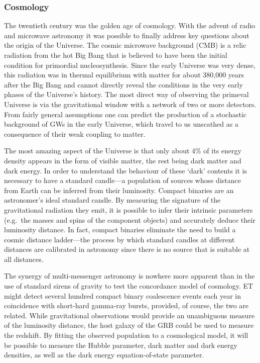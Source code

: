 \FloatBarrier
\subsubsection{Cosmology}
The twentieth century was the golden age of cosmology. With
the advent of radio and microwave astronomy it was possible to
finally address key questions about the origin of the
Universe.  The cosmic microwave background (CMB) is a relic radiation
from the hot Big Bang that is believed to have been the
initial condition for primordial nucleosynthesis. Since the early
Universe was very dense, this radiation was in thermal
equilibrium with matter for about 380,000 years after the Big
Bang and cannot directly reveal the conditions in the very
early phases of the Universe's history. The most direct way of
observing the primeval Universe is via the gravitational
window with a network of two or more detectors. From fairly
general assumptions one can predict the production of
a stochastic background of GWs in the early Universe, which travel
to us unscathed as a consequence of their weak coupling to matter.

The most amazing aspect of the Universe is that only about
4\% of its energy density appears in the form of visible matter,
the rest being dark matter and dark energy.
In order to understand the behaviour of these `dark' contents
it is necessary to have a standard candle---a population of
sources whose distance from Earth can be inferred from their
luminosity. 
Compact binaries are an astronomer's ideal standard candle. 
By measuring the signature of the gravitational radiation they emit,
it is possible to infer their intrinsic parameters (e.g.\ the
masses and spins of the component objects) and accurately
deduce their luminosity distance. In fact, compact binaries
eliminate the need to build a cosmic distance ladder---the
process by which standard candles at different distances are
calibrated in astronomy since there is no source that is
suitable at all distances.

The synergy of multi-messenger astronomy is nowhere more
apparent than in the use of standard sirens of gravity to
test the concordance model of cosmology.  ET might detect
several hundred compact binary coalescence events each year
in coincidence with short-hard gamma-ray bursts, provided, of
course, the two are related.  While gravitational observations would
provide an unambiguous measure of the luminosity distance,
the host galaxy of the GRB could be used to measure the
redshift. By fitting the observed population to a cosmological
model, it will be possible to measure the Hubble parameter,
dark matter and dark energy densities, as well as the
dark energy equation-of-state parameter.

